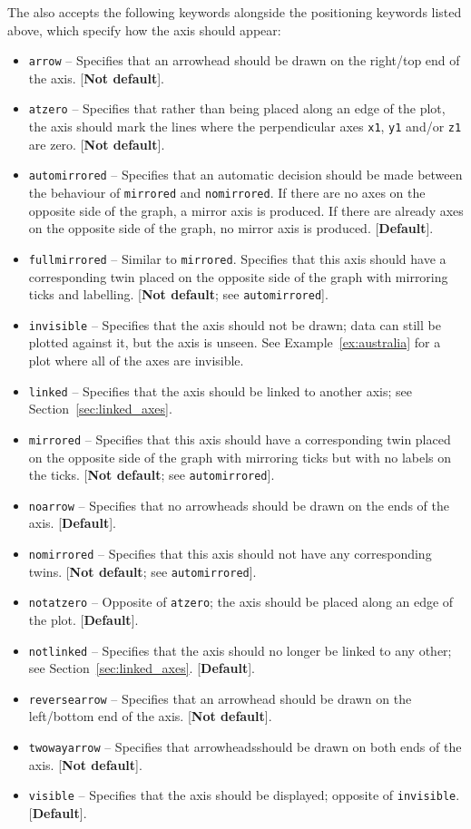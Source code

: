 The  also accepts the following keywords alongside the
positioning keywords listed above, which specify how the axis should appear:
\begin{itemize}
\item {\tt arrow} -- Specifies that an arrowhead should be drawn on the right/top end of the axis. [{\bf Not default}].
\item {\tt atzero} -- Specifies that rather than being placed along an edge of the plot, the axis should mark the lines where the perpendicular axes {\tt x1}, {\tt y1} and/or {\tt z1} are zero. [{\bf Not default}].
\item {\tt automirrored} -- Specifies that an automatic decision should be made between the behaviour of {\tt mirrored} and {\tt nomirrored}. If there are no axes on the opposite side of the graph, a mirror axis is produced. If there are already axes on the opposite side of the graph, no mirror axis is produced. [{\bf Default}].
\item {\tt fullmirrored} -- Similar to {\tt mirrored}. Specifies that this axis should have a corresponding twin placed on the opposite side of the graph with mirroring ticks and labelling. [{\bf Not default}; see {\tt automirrored}].
\item {\tt invisible} -- Specifies that the axis should not be drawn; data can still be plotted against it, but the axis is unseen. See Example~\ref{ex:australia} for a plot where all of the axes are invisible.
\item {\tt linked} -- Specifies that the axis should be linked to another axis; see Section~\ref{sec:linked_axes}.
\item {\tt mirrored} -- Specifies that this axis should have a corresponding twin placed on the opposite side of the graph with mirroring ticks but with no labels on the ticks. [{\bf Not default}; see {\tt automirrored}].
\item {\tt noarrow} -- Specifies that no arrowheads should be drawn on the ends of the axis. [{\bf Default}].
\item {\tt nomirrored} -- Specifies that this axis should not have any corresponding twins. [{\bf Not default}; see {\tt automirrored}].
\item {\tt notatzero} -- Opposite of {\tt atzero}; the axis should be placed along an edge of the plot. [{\bf Default}].
\item {\tt notlinked} -- Specifies that the axis should no longer be linked to any other; see Section~\ref{sec:linked_axes}. [{\bf Default}].
\item {\tt reversearrow} -- Specifies that an arrowhead should be drawn on the left/bottom end of the axis. [{\bf Not default}].
\item {\tt twowayarrow} -- Specifies that arrowheadsshould be drawn on both ends of the axis. [{\bf Not default}].
\item {\tt visible} -- Specifies that the axis should be displayed; opposite of {\tt invisible}. [{\bf Default}].
\end{itemize}

